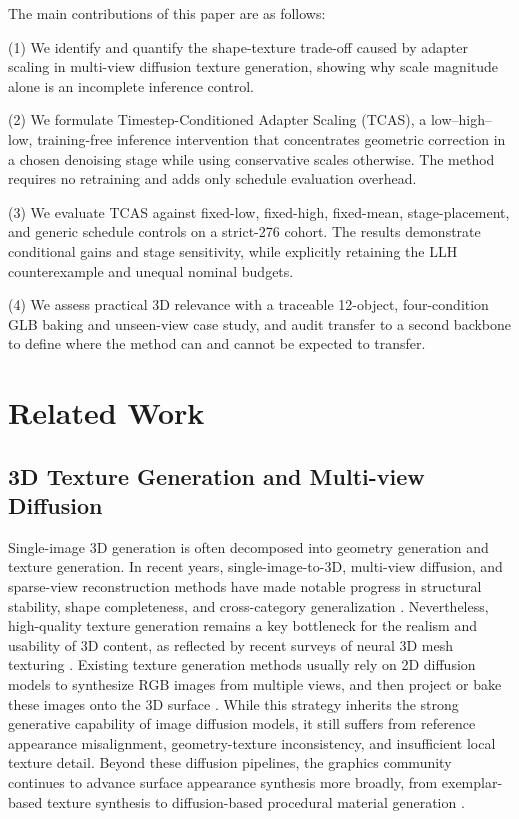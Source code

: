 \documentclass[times,twocolumn,final]{elsarticle}
\begin{document}
The main contributions of this paper are as follows:

(1) We identify and quantify the shape-texture trade-off caused by adapter scaling in multi-view diffusion texture generation, showing why scale magnitude alone is an incomplete inference control.

(2) We formulate Timestep-Conditioned Adapter Scaling (TCAS), a low--high--low, training-free inference intervention that concentrates geometric correction in a chosen denoising stage while using conservative scales otherwise. The method requires no retraining and adds only schedule evaluation overhead.

(3) We evaluate TCAS against fixed-low, fixed-high, fixed-mean, stage-placement, and generic schedule controls on a strict-276 cohort. The results demonstrate conditional gains and stage sensitivity, while explicitly retaining the LLH counterexample and unequal nominal budgets.

(4) We assess practical 3D relevance with a traceable 12-object, four-condition GLB baking and unseen-view case study, and audit transfer to a second backbone to define where the method can and cannot be expected to transfer.

\section{Related Work}
\label{sec:related}

\subsection{3D Texture Generation and Multi-view Diffusion}
\label{subsec:3dtex}

Single-image 3D generation is often decomposed into geometry generation and texture generation. In recent years, single-image-to-3D, multi-view diffusion, and sparse-view reconstruction methods have made notable progress in structural stability, shape completeness, and cross-category generalization \cite{liu2023zero1to3,shi2023zero123pp,liu2023syncdreamer,long2023wonder3d,shi2024mvdream,wang2023imagedream,xu2024instantmesh,ke2024era3d}. Nevertheless, high-quality texture generation remains a key bottleneck for the realism and usability of 3D content, as reflected by recent surveys of neural 3D mesh texturing \cite{perla2026survey}. Existing texture generation methods usually rely on 2D diffusion models to synthesize RGB images from multiple views, and then project or bake these images onto the 3D surface \cite{chen2023text2tex,richardson2023texture,poole2023dreamfusion,chen2023fantasia3d}. While this strategy inherits the strong generative capability of image diffusion models, it still suffers from reference appearance misalignment, geometry-texture inconsistency, and insufficient local texture detail. Beyond these diffusion pipelines, the graphics community continues to advance surface appearance synthesis more broadly, from exemplar-based texture synthesis \cite{guzman2026adaptive} to diffusion-based procedural material generation \cite{lv2025interpretable}.
\end{document}
